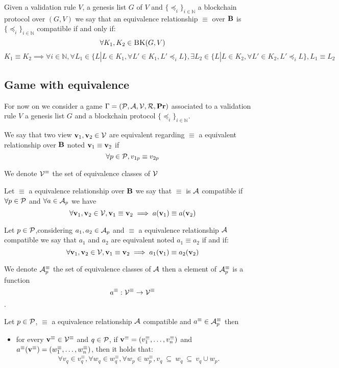 \begin{mydef}
	Given a validation rule $V$, a genesis list $G$ of $V$ and $\{ \preceq_i\}_{i \in \mathbb{N}}$ a blockchain protocol over $(G,V)$ we say that an equivalence relationship $\equiv$ over $\text{\bf B}$ is $\{ \preceq_i\}_{i \in \mathbb{N}}$ compatible if and only if:
	$$\forall K_1 , K_2 \in \text{\sc BK}(G,V)$$
	$$K_1 \equiv K_2 \implies \forall i \in \mathbb{N}, \forall L_1 \in \{L | L \in K_1, \forall L' \in K_1, L' \preceq_i L \}, \exists L_2 \in \{L | L \in K_2, \forall L' \in K_2, L' \preceq_i L \}, L_1 \equiv L_2$$
\end{mydef}


\subsection{Game with equivalence}

For now on we consider a game $\Gamma = (\mathcal{P},\mathcal{A},\mathcal{V},\mathcal{R},\mathbf{Pr})$ associated to  a validation rule $V$ a genesis list $G$ and a blockchain protocol $\{ \preceq_i\}_{i \in \mathbb{N}}$. 

We say that two view $\mathbf{v}_1, \mathbf{v}_2 \in \mathcal{V}$ are equivalent regarding $\equiv$ a equivalent relationship over $\text{\bf B}$ noted $\mathbf{v}_1\equiv \mathbf{v}_2$ if $$\forall p \in \mathcal{P}, v_{1p} \equiv v_{2p}$$

We denote $\mathcal{V}^\equiv$ the set of equivalence classes of $\mathcal{V}$

\begin{mydef}
	Let $\equiv$ a equivalence relationship over $\text{\bf B}$ we say that $\equiv$ is $\mathcal{A}$ compatible if $\forall p \in \mathcal{P}$ and $\forall a \in \mathcal{A}_p$ we have $$\forall \mathbf{v}_1,\mathbf{v}_2 \in \mathcal{V}, \mathbf{v}_1 \equiv \mathbf{v}_2 \implies a(\mathbf{v}_1) \equiv a(\mathbf{v}_2 )$$
\end{mydef}

\begin{mydef}
	Let $p \in \mathcal{P}$,considering $a_1, a_2 \in \mathcal{A}_p$ and $\equiv$ a equivalence relationship $\mathcal{A}$ compatible we say that $a_1$ and $a_2$ are equivalent noted $a_1 \equiv a_2$ if and if:
	$$\forall \mathbf{v}_1,\mathbf{v}_2 \in \mathcal{V}, \mathbf{v}_1 \equiv \mathbf{v}_2 \implies a_1(\mathbf{v}_1) \equiv a_2(\mathbf{v}_2)$$
\end{mydef}
We denote $\mathcal{A}^\equiv_p$ the set of equivalence classes of $\mathcal{A}$ then a element of $\mathcal{A}^\equiv_p$ is a function $$a^\equiv : \mathcal{V}^\equiv \rightarrow \mathcal{V}^\equiv$$.

\begin{myprop}
	Let $p \in \mathcal{P}$, $\equiv$ a equivalence relationship $\mathcal{A}$ compatible and $a^\equiv \in \mathcal{A}^\equiv_p $ then
	\begin{itemize}
		\item for every $\mathbf{v}^\equiv \in \mathcal{V}^\equiv$ and $q \in \mathcal{P}$, if $\mathbf{v}^\equiv = (v_1^\equiv, \ldots, v_n^\equiv)$ and $a^\equiv(\mathbf{v}^\equiv) = (w_1^\equiv, \ldots, w_n^\equiv)$, then it holds that:
		\begin{eqnarray*}
			\forall v_q \in v_q ^\equiv,\forall w_q \in w_q ^\equiv,\forall w_p \in w_p ^\equiv,  v_q \ \subseteq \ w_q \ \subseteq \ v_q \cup w_p.
		\end{eqnarray*}
	\end{itemize}
\end{myprop}

